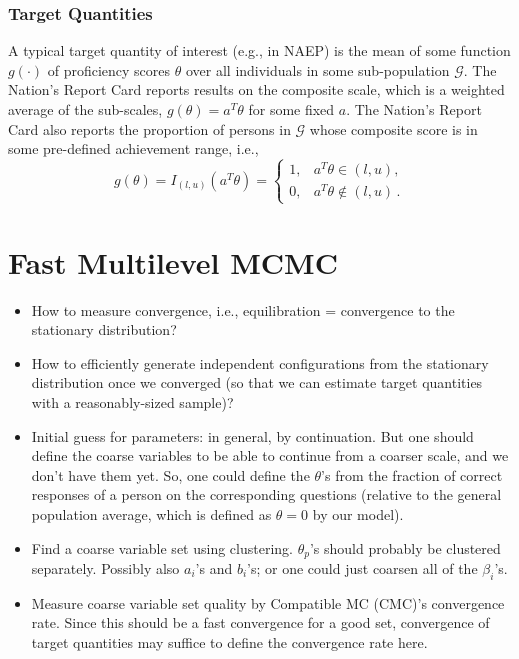 \documentclass{article}
\newcommand{\G}{\mathcal{G}}
\newcommand{\ta}{\theta}
\begin{document}
\subsubsection{Target Quantities}
A typical target quantity of interest (e.g., in NAEP) is the mean of some function $g(\cdot)$ of proficiency scores $\ta$ over all individuals in some sub-population $\G$. The Nation's Report Card reports results on the composite scale, which is a weighted average of the sub-scales, $g(\ta) = a^T \ta$ for some fixed $a$. The Nation's Report Card also reports the proportion of persons in $\G$ whose composite score is in some pre-defined achievement range, i.e.,
\begin{equation}
	g(\ta) = I_{(l,u)}(a^T \ta) =
  \begin{cases}
    1, & a^T \ta \in (l,u), \\
    0, & a^T \ta \not \in (l,u)\,.
  \end{cases}
\end{equation}

\section{Fast Multilevel MCMC}
\begin{itemize}
	\item How to measure convergence, i.e., equilibration = convergence to the stationary distribution? 
	\item How to efficiently generate independent configurations from the stationary distribution once we converged
	(so that we can estimate target quantities with a reasonably-sized sample)?
	\item Initial guess for parameters: in general, by continuation. But one should define the coarse variables
	to be able to continue from a coarser scale, and we don't have them yet. So, one could define the $\ta$'s
	from the fraction of correct responses of a person on the corresponding questions (relative to the general
	population average, which is defined as $\ta=0$ by our model).
	\item Find a coarse variable set using clustering. $\ta_p$'s should probably be clustered separately. 	Possibly also $a_i$'s and $b_i$'s; or one could just coarsen all of the $\beta_i$'s.
	\item Measure coarse variable set quality by Compatible MC (CMC)'s convergence rate. Since this should be a fast convergence for a good set, convergence of target quantities may suffice to define the convergence rate here.
\end{itemize}
\end{document}
